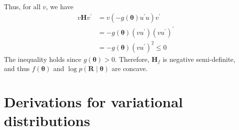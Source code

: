 Thus, for all $v$, we have 
\begin{equation}
    \begin{split}
        v \mathbf{H} v^{\prime} &=v\left(-g(\boldsymbol{\theta}) u^{\prime} u\right) v^{\prime} \\
        &=-g(\boldsymbol{\theta})\left(v u^{\prime}\right)\left(v u^{\prime}\right)^{\prime} \\
        &=-g(\boldsymbol{\theta})\left(v u^{\prime}\right)^{2} \leq 0
    \end{split}
\end{equation}
The inequality holds since $g(\bm\theta)>0$. Therefore, $\mathrm{\mathbf{H}}_f$ is negative semi-definite, and thus $f(\bm\theta)$ and $\log p(\bm{R}\mid\bm\theta)$ are concave.  

\chapter{Derivations for variational distributions}\label{sec:variational-dist}

